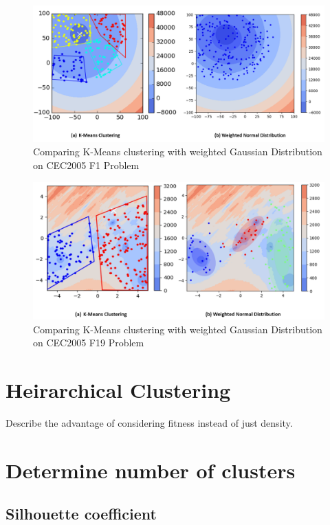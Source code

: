 \begin{figure} \centering
\includegraphics[width=\textwidth]{Clustering_comparison} \caption{Comparing K-Means clustering with weighted Gaussian Distribution on CEC2005 F1 Problem}\label{fig:Clustering_comparison}
\end{figure}

\begin{figure}
\centering
\includegraphics[width=\textwidth]{Clustering_comparison_F19}
\caption{Comparing K-Means clustering with weighted Gaussian Distribution on CEC2005 F19 Problem}\label{fig:Clustering_comparison_F19}
\end{figure}

\section{Heirarchical Clustering}
Describe the advantage of considering fitness instead of just density.


\section{Determine number of clusters}

\subsection{Silhouette coefficient}

